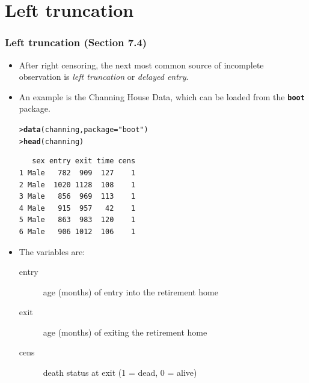 \documentclass[10pt]{beamer}\usepackage[]{graphicx}\usepackage[]{color}
\makeatletter
\newcommand{\hlstr}[1]{\textcolor[rgb]{0.192,0.494,0.8}{#1}}%
\newcommand{\hlstd}[1]{\textcolor[rgb]{0.345,0.345,0.345}{#1}}%
\newcommand{\hlkwc}[1]{\textcolor[rgb]{0.333,0.667,0.333}{#1}}%
\newcommand{\hlkwd}[1]{\textcolor[rgb]{0.737,0.353,0.396}{\textbf{#1}}}%
\newenvironment{kframe}{%
 \def\at@end@of@kframe{}%
 \ifinner\ifhmode%
  \def\at@end@of@kframe{\end{minipage}}%
  \begin{minipage}{\columnwidth}%
 \fi\fi%
 \def\FrameCommand##1{\hskip\@totalleftmargin \hskip-\fboxsep
 \colorbox{shadecolor}{##1}\hskip-\fboxsep
     \hskip-\linewidth \hskip-\@totalleftmargin \hskip\columnwidth}%
 \MakeFramed {\advance\hsize-\width
   \@totalleftmargin\z@ \linewidth\hsize
   \@setminipage}}%
 {\par\unskip\endMakeFramed%
 \at@end@of@kframe}
\newenvironment{knitrout}{}{} %
\renewenvironment{knitrout}{\setlength{\topsep}{-.2mm}}{}
\newcommand{\empr}[1]{{\emph{\color{red}#1}}}
\newcommand{\pkg}[1]{{\textbf{\texttt{#1}}}}
\makeatother
\begin{document}
\section{Left truncation}
\begin{frame}[fragile]
  \frametitle{Left truncation (Section 7.4)}
  \begin{itemize}
  \item After right censoring, the next most common source of incomplete observation is \empr{left truncation} or \empr{delayed entry}.
  \item An example is the Channing House Data, which can be loaded from the \pkg{boot} package.
\begin{knitrout}\scriptsize
{}\color{fgcolor}\begin{kframe}
\begin{alltt}
\hlstd{> }\hlkwd{data}\hlstd{(channing,} \hlkwc{package} \hlstd{=} \hlstr{"boot"}\hlstd{)}
\hlstd{> }\hlkwd{head}\hlstd{(channing)}
\end{alltt}
\begin{verbatim}
   sex entry exit time cens
1 Male   782  909  127    1
2 Male  1020 1128  108    1
3 Male   856  969  113    1
4 Male   915  957   42    1
5 Male   863  983  120    1
6 Male   906 1012  106    1
\end{verbatim}
\end{kframe}
\end{knitrout}
  \item The variables are: 
    \begin{description}
    \item[entry] age (months) of entry into the retirement home
    \item[exit] age (months) of exiting the retirement home
    \item[cens] death status at exit (1 = dead, 0 = alive)
    \end{description}
  \end{itemize}  
\end{frame}    
    
\end{document}
